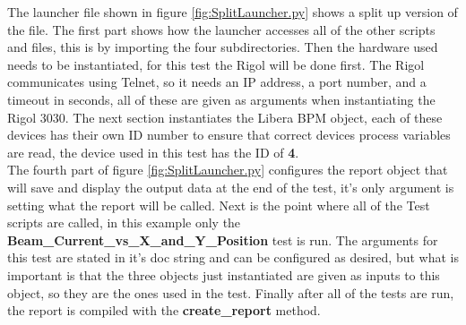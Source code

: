 \documentclass[a4paper, 11pt]{article}
\begin{document}
The launcher file shown in figure \ref{fig:SplitLauncher.py} shows a split up version of the file. The first part shows how the launcher accesses all of the other scripts and files, this is by importing the four subdirectories. Then the hardware used needs to be instantiated, for this test the Rigol will be done first. The Rigol communicates using Telnet, so it needs an IP address, a port number, and a timeout in seconds, all of these are given as arguments when instantiating the Rigol 3030. The next section instantiates the Libera BPM object, each of these devices has their own ID number to ensure that correct devices process variables are read, the device used in this test has the ID of \textbf{4}.\\ 
The fourth part of figure \ref{fig:SplitLauncher.py} configures the report object that will save and display the output data at the end of the test, it's only argument is setting what the report will be called. Next is the point where all of the Test scripts are called, in this example only the \textbf{Beam\_Current\_vs\_X\_and\_Y\_Position} test is run. The arguments for this test are stated in it's doc string and can be configured as desired, but what is important is that the three objects just instantiated are given as inputs to this object, so they are the ones used in the test. Finally after all of the tests are run, the report is compiled with the \textbf{create\_report} method. 
\end{document}
